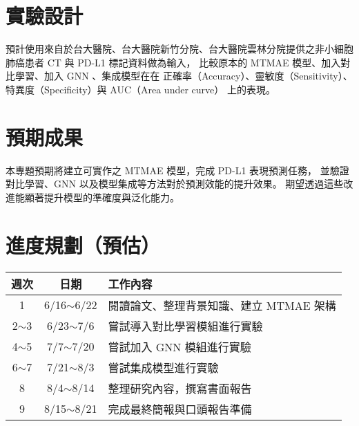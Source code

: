 \documentclass[12pt,a4paper]{article}
\begin{document}
\section{實驗設計}

預計使用來自於台大醫院、台大醫院新竹分院、台大醫院雲林分院提供之非小細胞肺癌患者 CT 與 PD-L1 標記資料做為輸入，
比較原本的 MTMAE 模型、加入對比學習、加入 GNN 、集成模型在在
正確率（Accuracy）、靈敏度（Sensitivity）、  特異度（Specificity）與 AUC（Area under curve）
上的表現。

\section{預期成果}
本專題預期將建立可實作之 MTMAE 模型，完成 PD-L1 表現預測任務，
並驗證對比學習、GNN 以及模型集成等方法對於預測效能的提升效果。
期望透過這些改進能顯著提升模型的準確度與泛化能力。

\section{進度規劃（預估）}
\begin{tabular}{|c|c |l|  }
    \hline
    週次 & 日期 & 工作內容 \\
    \hline\hline
    1 & 6/16$\sim$6/22 & 閱讀論文、整理背景知識、建立 MTMAE 架構 \\
    \hline
    2$\sim$3 & 6/23$\sim$7/6 & 嘗試導入對比學習模組進行實驗 \\
    \hline
    4$\sim$5 & 7/7$\sim$7/20 & 嘗試加入 GNN 模組進行實驗 \\
    \hline
    6$\sim$7 & 7/21$\sim$8/3 & 嘗試集成模型進行實驗 \\
    \hline
    8 & 8/4$\sim$8/14 & 整理研究內容，撰寫書面報告 \\
    \hline
    9 & 8/15$\sim$8/21 & 完成最終簡報與口頭報告準備 \\
    \hline
\end{tabular}
\end{document}
